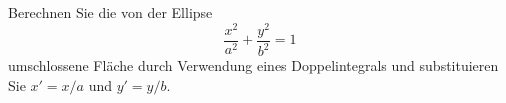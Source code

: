 \begin{atiTask}[
  title = Fläche einer Ellipse,
]
 Berechnen Sie die von der Ellipse 
 \begin{equation*}
\frac{x^2}{a^2}+\frac{y^2}{b^2}=1
 \end{equation*}
 umschlossene Fläche durch Verwendung eines Doppelintegrals und substituieren Sie $x'=x/a$ und $y'=y/b$. 
\end{atiTask}